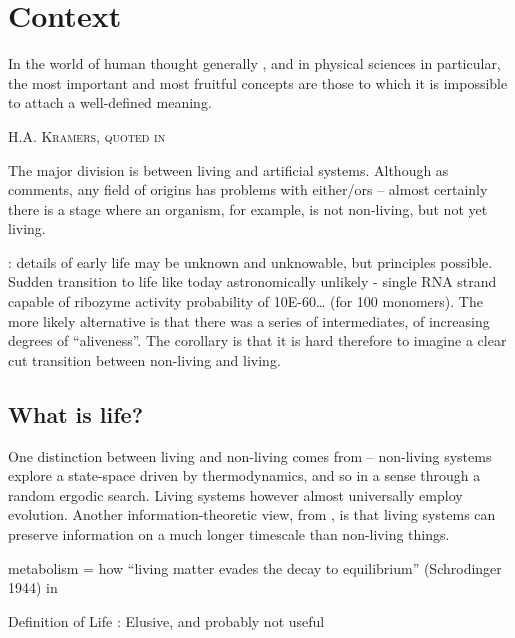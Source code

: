 \chapter{Context}

\epigraph{%
In the world of human thought generally , and in physical sciences in particular, the most important and most fruitful concepts are those to which it is impossible to attach a well-defined meaning.}%
{\textsc{H.A. Kramers, quoted in \autocite{Bruylants2010}}}

The major division is between living and artificial systems. Although as \autocite{Bruylants2010} comments, any field of origins has problems with
either/ors -- almost certainly there is a stage where an organism, for example, is not non-living, but not yet living.

 \autocite{Pascal2013}: details of early life may be unknown and unknowable, but principles possible. Sudden transition to life like today astronomically unlikely - single RNA strand capable of ribozyme activity probability of 10E-60\ldots{} (for 100 monomers). The more likely alternative is that there was a series of intermediates, of increasing degrees of ``aliveness''. The corollary is that it is hard therefore to imagine a clear cut transition between non-living and living.

\section{What is life?}\label{what-is-life}

One distinction between living and non-living comes from \autocite{Rasmussen2004} -- non-living systems explore a state-space driven by thermodynamics, and so in a sense through a random ergodic search. Living systems however almost universally employ evolution. Another information-theoretic view, from \autocite{Adami2015}, is that living systems can preserve information on a much longer timescale than non-living things.

			metabolism = how ``living matter evades the decay to equilibrium''
			(Schrodinger 1944) in \autocite{Pascal2013}

			Definition of Life  \autocite{Pascal2013}: Elusive, and probably not useful
			
